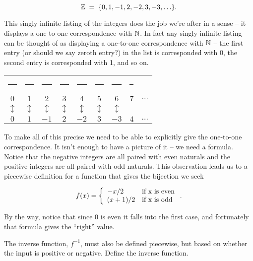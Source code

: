 \[ {\mathbb Z} \; = \; \{0, 1, -1, 2, -2, 3, -3, \ldots \}. \]

\noindent This singly infinite listing of the integers does the job 
we're after in a sense
-- it displays a one-to-one correspondence with ${\mathbb N}$.  In fact 
any singly infinite listing can be thought of as displaying a one-to-one correspondence with ${\mathbb N}$ 
-- the first entry (or should we say zeroth entry?) in the list is corresponded
with 0, the second entry is corresponded with 1, and so on.
\medskip

\begin{tabular}{ccccccccc}
\rule{32pt}{0pt} & \rule{32pt}{0pt} & \rule{32pt}{0pt} & \rule{32pt}{0pt} & \rule{32pt}{0pt} & \rule{32pt}{0pt} & \rule{32pt}{0pt} & \rule{32pt}{0pt} \\
$0$ & $1$ & $2$ & $3$ & $4$ & $5$ & $6$ & $7$ & $\ldots$ \\
$\updownarrow$ & $\updownarrow$ & $\updownarrow$ & $\updownarrow$ & $\updownarrow$ & $\updownarrow$ & $\updownarrow$ & \\
$0$ & $1$ & $-1$ & $2$ & $-2$ & $3$ & $-3$ & $4$ & $\ldots$ \\
\end{tabular}
\medskip

To make all of this precise we need to be able to explicitly give the 
one-to-one correspondence.  It isn't enough to have a picture 
of it -- we need a
formula.  Notice that the negative integers are all paired with even naturals
and the positive integers are all paired with odd naturals.  This observation
leads us to a piecewise definition for a function that gives the bijection we
seek

\[ f(x) = \left\{ \begin{array}{cl} -x/2 \rule{16pt}{0pt} & \mbox{if x is even}\\
(x + 1)/2 & \mbox{if x is odd} \end{array} \right. .\]

By the way, notice that since 0 is even it falls into the first case, and
fortunately that formula gives the ``right'' value.

\begin{exer}
The inverse function, $f^{-1}$, must also be defined piecewise, but
based on whether the input is positive or negative.  Define the inverse function.
\end{exer}

